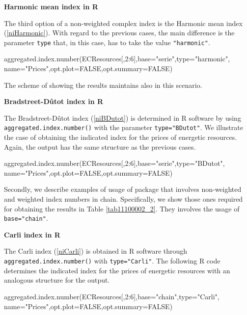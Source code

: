 \vspace*{0.15 cm}\noindent\textbf{Harmonic mean index in R}

\noindent The third option of a non-weighted complex index is the Harmonic mean index (\ref{niHarmonic}). With regard to the previous cases, the main difference is the parameter \verb|type| that, in this case, has to take the value \verb|"harmonic"|.
\begin{example}
aggregated.index.number(ECResources[,2:6],base="serie",type="harmonic",
                        name="Prices",opt.plot=FALSE,opt.summary=FALSE)
\end{example}
The scheme of showing the results maintains also in this scenario.


\vspace*{0.15 cm}\noindent\textbf{Bradstreet-D\^utot index in R}

\noindent The Bradstreet-D\^utot index (\ref{niBDutot}) is determined in R software by using  \verb|aggregated.index.number()| with the parameter \verb|type="BDutot"|. We illustrate the case of obtaining the indicated index for the prices of energetic resources. Again, the output has the same structure as the previous cases.

\begin{example}
aggregated.index.number(ECResources[,2:6],base="serie",type="BDutot",
                        name="Prices",opt.plot=FALSE,opt.summary=FALSE)
\end{example}

\vspace*{0.5 cm}Secondly, we describe examples of usage of  package that involves non-weighted and weighted index numbers in chain. Specifically, we show those ones required for obtaining the results in Table \ref{tab11100002_2}. They involves the usage of  \verb|base="chain"|. 

\vspace*{0.15 cm}\noindent\textbf{Carli index in R}

\noindent The Carli index (\ref{niCarli}) is obtained in R software through  \verb|aggregated.index.number()| with \verb|type="Carli"|. The following R code determines the indicated index for the prices of energetic resources with an analogous structure for the output.
\begin{example}
aggregated.index.number(ECResources[,2:6],base="chain",type="Carli",
			name="Prices",opt.plot=FALSE,opt.summary=FALSE)
\end{example}


